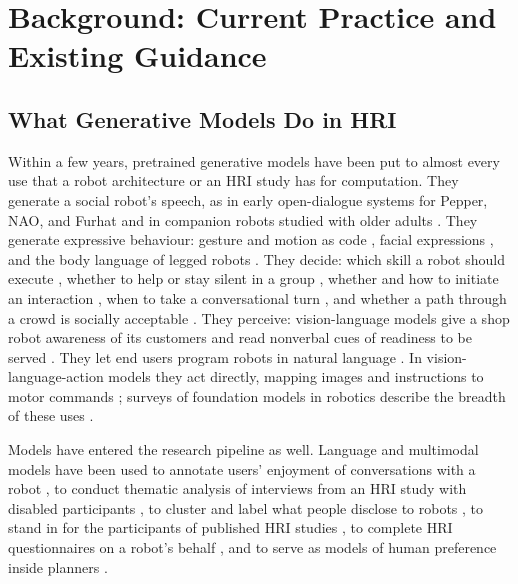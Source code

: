\section{Background: Current Practice and Existing Guidance}
\label{sec:background}

\subsection{What Generative Models Do in HRI}

Within a few years, pretrained generative models have been put to almost
every use that a robot architecture or an HRI study has for computation.
They generate a social robot's speech, as in early open-dialogue systems for
Pepper, NAO, and Furhat \cite{billing2023language,cherakara2023furchat} and
in companion robots studied with older adults
\cite{irfan2024recommendations,irfan2025between,lima2025promoting}. They
generate expressive behaviour: gesture and motion as code
\cite{mahadevan2024generative}, facial expressions
\cite{antony2025xpress,mishra2023realtime}, and the body language of legged
robots \cite{roy2025gpt}. They decide: which skill a robot should execute
\cite{ahn2022do,liang2023code}, whether to help or stay silent in a group
\cite{tanneberg2024help}, whether and how to initiate an interaction
\cite{sasabuchi2025agreeing}, when to take a conversational turn
\cite{skantze2025applying}, and whether a path through a crowd is socially
acceptable \cite{song2025vlm}. They perceive: vision-language models give a
shop robot awareness of its customers \cite{edirisinghe2026welcome} and read
nonverbal cues of readiness to be served \cite{bu2025using}. They let end
users program robots in natural language \cite{karli2024alchemist}. In
vision-language-action models they act directly, mapping images and
instructions to motor commands
\cite{zitkovich2023rt2,kim2025openvla,black2025pi0}; surveys of foundation
models in robotics describe the breadth of these uses
\cite{firoozi2025foundation,kawaharazuka2024real}.

Models have entered the research pipeline as well. Language and multimodal
models have been used to annotate users' enjoyment of conversations with a
robot \cite{pereira2024multimodal}, to conduct thematic analysis of
interviews from an HRI study with disabled participants
\cite{markelius2026evaluating}, to cluster and label what people disclose to
robots \cite{chiang2025selfdisclosure}, to stand in for the participants of
published HRI studies \cite{wachowiak2024large}, to complete HRI
questionnaires on a robot's behalf \cite{lockwood2026when}, and to serve as
models of human preference inside planners \cite{zhang2023largeb}.

